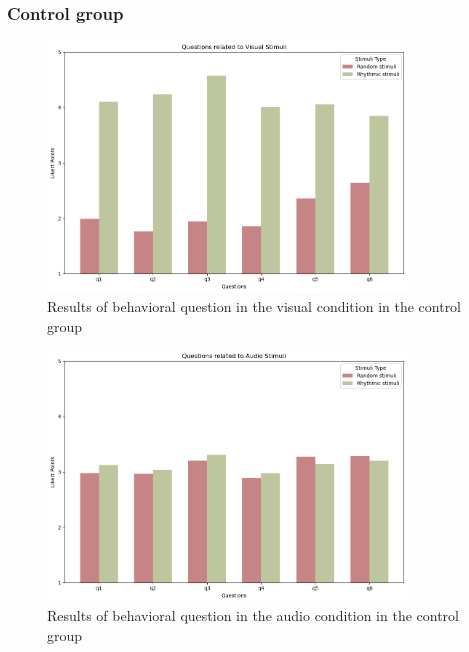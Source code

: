 \subsubsection*{Control group}
\begin{figure}[H]
    \centering
    \includegraphics[width=0.85\textwidth]{bar_plots/bar_visual_h.png}
    \caption{Results of behavioral question in the visual condition in the control group}
    \label{fig: bar_control_Total} 
\end{figure} 
\begin{figure}[H]
    \centering
    \includegraphics[width=0.85\textwidth]{bar_plots/bar_audio_h.png}
    \caption{Results of behavioral question in the audio condition in the control group}
    \label{fig: bar_audio_control} 
\end{figure} 
